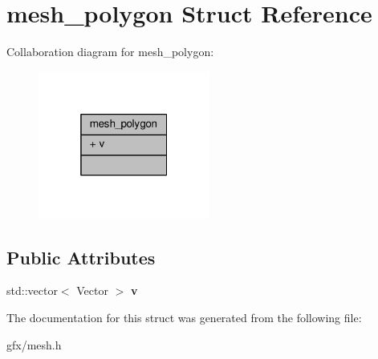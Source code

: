 \hypertarget{structmesh__polygon}{}\section{mesh\+\_\+polygon Struct Reference}
\label{structmesh__polygon}


Collaboration diagram for mesh\+\_\+polygon\+:
\nopagebreak
\begin{figure}[H]
\begin{center}
\leavevmode
\includegraphics[width=160pt]{d7/dc2/structmesh__polygon__coll__graph}
\end{center}
\end{figure}
\subsection*{Public Attributes}
\begin{DoxyCompactItemize}
\item 
std\+::vector$<$ Vector $>$ {\bfseries v}\hypertarget{structmesh__polygon_a039c75b0cfba0cc401601448582d19ef}{}\label{structmesh__polygon_a039c75b0cfba0cc401601448582d19ef}

\end{DoxyCompactItemize}


The documentation for this struct was generated from the following file\+:\begin{DoxyCompactItemize}
\item 
gfx/mesh.\+h\end{DoxyCompactItemize}
